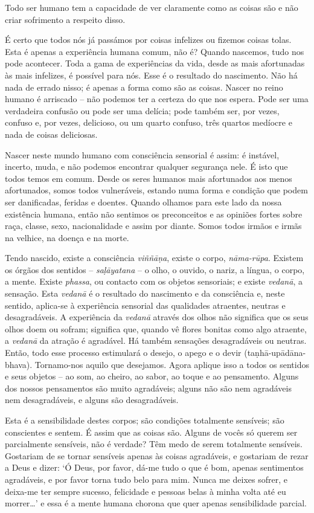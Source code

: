 Todo ser humano tem a capacidade de ver claramente como as coisas são e não
criar sofrimento a respeito disso.

É certo que todos nós já passámos por coisas infelizes ou fizemos coisas tolas.
Esta é apenas a experiência humana comum, não é? Quando nascemos, tudo nos pode
acontecer. Toda a gama de experiências da vida, desde as mais afortunadas às
mais infelizes, é possível para nós. Esse é o resultado do nascimento. Não há
nada de errado nisso; é apenas a forma como são as coisas. Nascer no reino
humano é arriscado -- não podemos ter a certeza do que nos espera. Pode ser uma
verdadeira confusão ou pode ser uma delícia; pode também ser, por vezes, confuso
e, por vezes, delicioso, ou um quarto confuso, três quartos medíocre e nada de
coisas deliciosas.

Nascer neste mundo humano com consciência sensorial é assim: é instável,
incerto, muda, e não podemos encontrar qualquer segurança nele. É isto que todos
temos em comum. Desde os seres humanos mais afortunados aos menos afortunados,
somos todos vulneráveis, estando numa forma e condição que podem ser
danificadas, feridas e doentes. Quando olhamos para este lado da nossa
existência humana, então não sentimos os preconceitos e as opiniões fortes sobre
raça, classe, sexo, nacionalidade e assim por diante. Somos todos irmãos e irmãs
na velhice, na doença e na morte.

Tendo nascido, existe a consciência \emph{viññāṇa}, existe o corpo,
\emph{nāma-rūpa}. Existem os órgãos dos sentidos -- \emph{saḷāyatana} -- o
olho, o ouvido, o nariz, a língua, o corpo, a mente. Existe \emph{phassa}, ou
contacto com os objetos sensoriais; e existe \emph{vedanā}, a sensação. Esta
\emph{vedanā} é o resultado do nascimento e da consciência e, neste sentido,
aplica-se à experiência sensorial das qualidades atraentes, neutras e
desagradáveis. A experiência da \emph{vedanā} através dos olhos não significa
que os seus olhos doem ou sofram; significa que, quando vê flores bonitas como
algo atraente, a \emph{vedanā} da atração é agradável. Há também sensações
desagradáveis ou neutras. Então, todo esse processo estimulará o desejo, o apego
e o devir (taṇhā-upādāna-bhava). Tornamo-nos aquilo que desejamos. Agora
aplique isso a todos os sentidos e seus objetos -- ao som, ao cheiro, ao sabor,
ao toque e ao pensamento. Alguns dos nossos pensamentos são muito agradáveis;
alguns não são nem agradáveis nem desagradáveis, e alguns são desagradáveis.

Esta é a sensibilidade destes corpos; são condições totalmente sensíveis; são
conscientes e sentem. É assim que as coisas são. Alguns de vocês só querem ser
parcialmente sensíveis, não é verdade? Têm medo de serem totalmente sensíveis.
Gostariam de se tornar sensíveis apenas às coisas agradáveis, e gostariam de
rezar a Deus e dizer: `Ó Deus, por favor, dá-me tudo o que é bom, apenas
sentimentos agradáveis, e por favor torna tudo belo para mim. Nunca me deixes
sofrer, e deixa-me ter sempre sucesso, felicidade e pessoas belas à minha volta
até eu morrer\ldots{}' e essa é a mente humana chorona que quer apenas
sensibilidade parcial.

